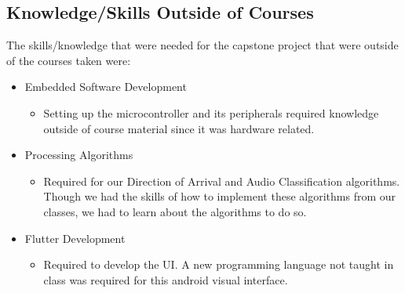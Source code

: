 \documentclass{article}
\begin{document}
\subsection{Knowledge/Skills Outside of Courses}


The skills/knowledge that were needed for the capstone project that were outside 
of the courses taken were:

\begin{itemize}
    \item Embedded Software Development 
    \begin{itemize}
        \item Setting up the microcontroller and its peripherals required 
        knowledge outside of course material since it was hardware related. 
    \end{itemize}
    \item Processing Algorithms 
    \begin{itemize}
        \item Required for our Direction of Arrival and Audio Classification 
        algorithms. Though we had the skills of how to implement these 
        algorithms from our classes, we had to learn about the algorithms to 
        do so. 
    \end{itemize}
    \item Flutter Development 
    \begin{itemize}
        \item Required to develop the UI. A new programming language not taught 
        in class was required for this android visual interface. 
    \end{itemize}
\end{itemize}

\newpage


\end{document}

